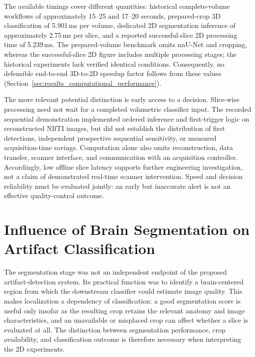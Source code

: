 The available timings cover different quantities: historical complete-volume workflows of approximately 15--25 and 17--20 seconds, prepared-crop 3D classification of 5.901\,ms per volume, dedicated 2D segmentation inference of approximately 2.75\,ms per slice, and a reported successful-slice 2D processing time of 5.239\,ms. The prepared-volume benchmark omits nnU-Net and cropping, whereas the successful-slice 2D figure includes multiple processing stages; the historical experiments lack verified identical conditions. Consequently, no defensible end-to-end 3D-to-2D speedup factor follows from these values (Section~\ref{sec:results_computational_performance}).

The more relevant potential distinction is early access to a decision. Slice-wise processing need not wait for a completed volumetric classifier input. The recorded sequential demonstration implemented ordered inference and first-trigger logic on reconstructed NIfTI images, but did not establish the distribution of first detections, independent prospective sequential sensitivity, or measured acquisition-time savings. Computation alone also omits reconstruction, data transfer, scanner interface, and communication with an acquisition controller. Accordingly, low offline slice latency supports further engineering investigation, not a claim of demonstrated real-time scanner intervention. Speed and decision reliability must be evaluated jointly: an early but inaccurate alert is not an effective quality-control outcome.

\section{Influence of Brain Segmentation on Artifact Classification}
\label{sec:discussion_segmentation_influence}

The segmentation stage was not an independent endpoint of the proposed artifact-detection system. Its practical function was to identify a brain-centered region from which the downstream classifier could estimate image quality. This makes localization a dependency of classification: a good segmentation score is useful only insofar as the resulting crop retains the relevant anatomy and image characteristics, and an unavailable or misplaced crop can affect whether a slice is evaluated at all. The distinction between segmentation performance, crop availability, and classification outcome is therefore necessary when interpreting the 2D experiments.

